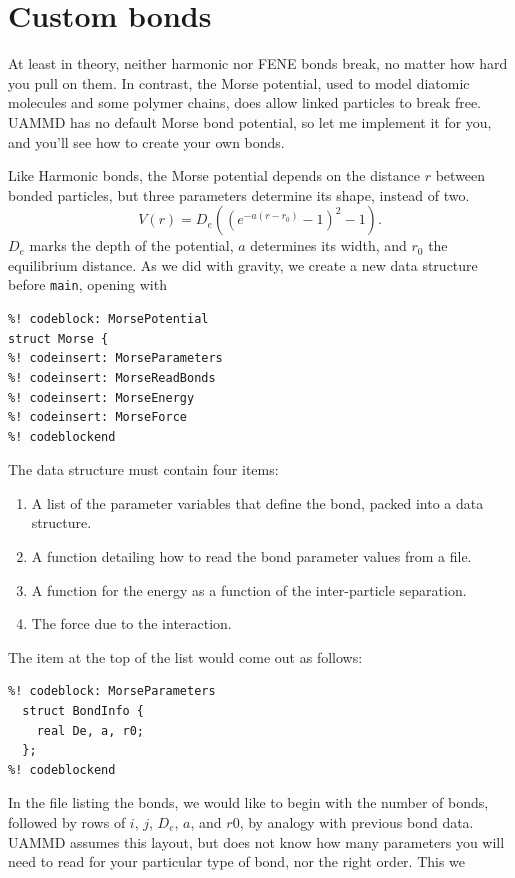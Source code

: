 \section{Custom bonds}

At least in theory, neither harmonic nor FENE bonds break, no matter how hard
you pull on them. In contrast, the Morse potential, used to model diatomic
molecules and some polymer chains, does allow linked particles to break free.
UAMMD has no default Morse bond potential, so let me implement it for you, and 
you'll see how to create your own bonds.

Like Harmonic bonds, the Morse potential depends on the distance $r$ between 
bonded particles, but three parameters determine its shape, instead of two.
\begin{equation*}
  V(r) = D_e\left(\left(e^{-a(r - r_0)} - 1\right)^2 - 1\right).
\end{equation*}
$D_e$ marks the depth of the potential, $a$ determines its width, and $r_0$ the
equilibrium distance. As we did with gravity, we create a new data structure
before \texttt{main}, opening with
\begin{lstlisting}
%! codeblock: MorsePotential
struct Morse {
%! codeinsert: MorseParameters
%! codeinsert: MorseReadBonds
%! codeinsert: MorseEnergy
%! codeinsert: MorseForce
%! codeblockend
\end{lstlisting}
The data structure must contain four items:
\begin{enumerate}
  \item A list of the parameter variables that define the bond, packed into a
        data structure.
  \item A function detailing how to read the bond parameter values from a file.
  \item A function for the energy as a function of the inter-particle 
        separation.
  \item The force due to the interaction.
\end{enumerate}
The item at the top of the list would come out as follows:
\begin{lstlisting}
%! codeblock: MorseParameters
  struct BondInfo {
    real De, a, r0;
  };
%! codeblockend
\end{lstlisting}
In the file listing the bonds, we would like to begin with the number of bonds,
followed by rows of $i$, $j$, $D_e$, $a$, and $r0$, by analogy with previous
bond data. UAMMD assumes this layout, but does not know how many parameters you
will need to read for your particular type of bond, nor the right order. This we
